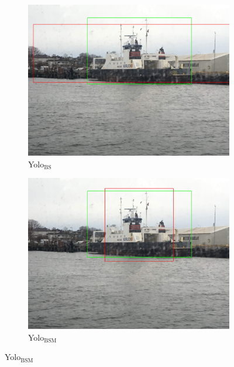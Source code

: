 \begin{figure}[h!]
\begin{subfigure}{.5\textwidth}
  \centering
  \includegraphics[width=0.75\linewidth]{results/case_tr_moor/yolo12/yolo1/big/IMG_2566.jpg}
  \caption{Yolo$_{\text{BS}}$}
\end{subfigure}%
\begin{subfigure}{.5\textwidth}
  \centering
  \includegraphics[width=.75\linewidth]{results/case_tr_moor/yolo12/yolo2/big/IMG_2566.jpg}
  \caption{Yolo$_{\text{BSM}}$}
\end{subfigure}


\end{figure}
